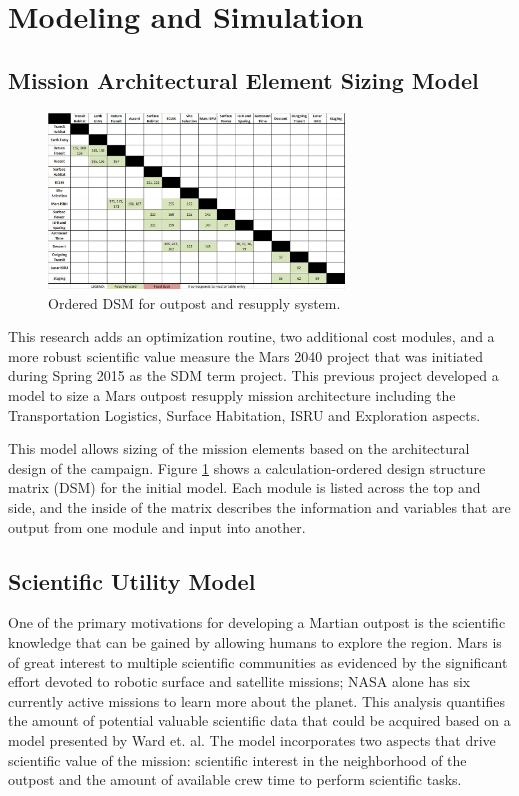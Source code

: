 \documentclass[]{aiaa-pretty}
\begin{document}
\section{Modeling and Simulation}
\label{sec:model}


\subsection{Mission Architectural Element Sizing Model}
\begin{figure}[h!]
	\centering
	\includegraphics[width=0.7\textwidth]{OrderedDSM}
	\caption{Ordered DSM for outpost and resupply system.}
	\label{fig:orderedDSM}
\end{figure}
This research adds an optimization routine, two additional cost modules, and a more robust scientific value measure the Mars 2040 project that was initiated during Spring 2015 as the SDM term project.  This previous project developed a model to size a Mars outpost resupply mission architecture including the Transportation Logistics, Surface Habitation, ISRU and Exploration aspects. 

This model allows sizing of the mission elements based on the architectural design of the campaign. Figure \ref{fig:orderedDSM} shows a calculation-ordered design structure matrix (DSM) for the initial model. Each module is listed across the top and side, and the inside of the matrix describes the information and variables that are output from one module and input into another. 

\subsection{Scientific Utility Model}

One of the primary motivations for developing a Martian outpost is the scientific knowledge that can be gained by allowing humans to explore the region. Mars is of great interest to multiple scientific communities as evidenced by the significant effort devoted to robotic surface and satellite missions; NASA alone has six currently active missions to learn more about the planet. \cite{nasa2016mars} This analysis quantifies the amount of potential valuable scientific data that could be acquired based on a model presented by Ward et. al. \cite{ward2015} The model incorporates two aspects that drive scientific value of the mission: scientific interest in the neighborhood of the outpost and the amount of available crew time to perform scientific tasks.
\end{document}
